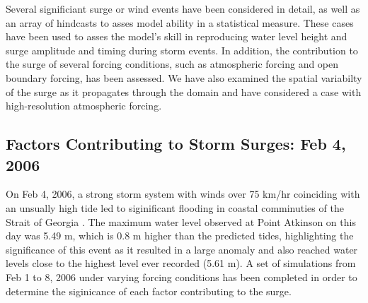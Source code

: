 \documentclass[pdftex,10pt]{article}
\begin{document}
Several significiant surge or wind events have been considered in detail, as well as an array of hindcasts to asses model ability in a statistical measure. These cases have been used to asses the model's skill in reproducing water level height and surge amplitude and timing during storm events. In addition, the contribution to the surge of several forcing conditions, such as atmospheric forcing and open boundary forcing, has been assessed. We have also examined the spatial variabilty of the surge as it propagates through the domain and have considered a case with high-resolution atmospheric forcing. 



\subsection{Factors Contributing to Storm Surges: Feb 4, 2006}

On Feb 4, 2006, a strong storm system with winds over 75 km/hr coinciding with an unsually high tide led to siginificant flooding in coastal comminuties of the Strait of Georgia \citep{romanowski2010storm}. The maximum water level observed at Point Atkinson on this day was 5.49 m, which is 0.8 m higher than the predicted tides, highlighting the significance of this event as it resulted in a large anomaly and also reached water levels close to the highest level ever recorded (5.61 m). A set of simulations from Feb 1 to 8, 2006 under varying forcing conditions has been completed in order to determine the siginicance of each factor contributing to the surge.
\end{document}
